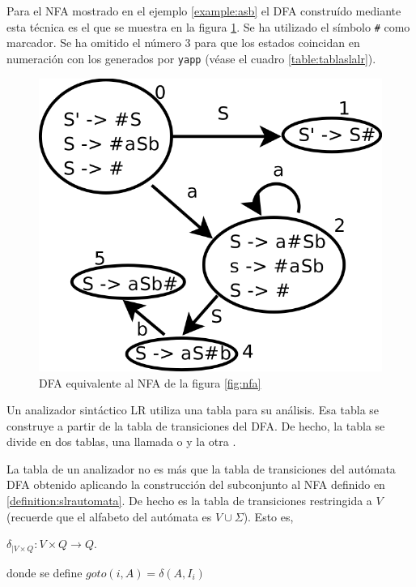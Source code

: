 Para el NFA mostrado en el ejemplo \ref{example:asb} el DFA construído mediante esta
técnica es el que se muestra en la figura \ref{fig:dfa}. Se ha utilizado el símbolo
\verb|#| como marcador. Se ha omitido el número 3 para que los estados coincidan
en numeración con los generados por \verb|yapp| (véase el cuadro
\ref{table:tablaslalr}).

\begin{center}
\begin{figure}[htb]
\centerline{\includegraphics[scale=1.2]{chapter_bottomup/dfa.png}}
\caption{DFA equivalente al NFA de la figura \ref{fig:nfa}}
\label{fig:dfa}
\end{figure}
\end{center}

Un analizador sintáctico LR utiliza una tabla para su análisis.
Esa tabla se construye a partir de la tabla de transiciones del DFA.
De hecho, la tabla se divide en dos tablas, una llamada 
 o  y la otra
.

La tabla  de un analizador 
no es más que la tabla de transiciones del autómata DFA 
obtenido aplicando la construcción del subconjunto al NFA
definido en \ref{definition:slrautomata}. De hecho es la tabla
de transiciones restringida a $V$ (recuerde que el alfabeto del
autómata es $V \cup \Sigma$).
Esto es, 

\begin{center}
$\delta_{| V \times Q} :  V \times Q \rightarrow Q$. 

donde se define $goto(i, A) = \delta(A,I_i)$
\end{center}

